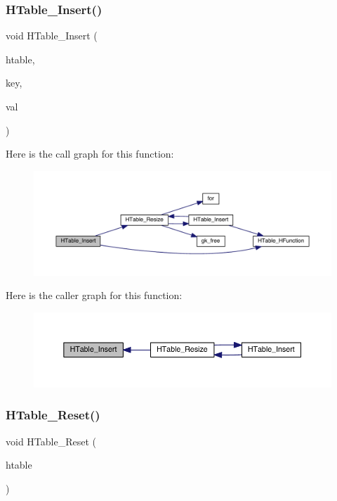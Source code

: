 \subsubsection{\texorpdfstring{H\+Table\+\_\+\+Insert()}{HTable\_Insert()}}
{\footnotesize\ttfamily void H\+Table\+\_\+\+Insert (\begin{DoxyParamCaption}\item[{\hyperlink{a00650}{gk\+\_\+\+H\+Table\+\_\+t} $\ast$}]{htable,  }\item[{int}]{key,  }\item[{int}]{val }\end{DoxyParamCaption})}

Here is the call graph for this function\+:\nopagebreak
\begin{figure}[H]
\begin{center}
\leavevmode
\includegraphics[width=350pt]{a00077_a39853dc7129323e7846d895c9026ad6f_cgraph}
\end{center}
\end{figure}
Here is the caller graph for this function\+:\nopagebreak
\begin{figure}[H]
\begin{center}
\leavevmode
\includegraphics[width=350pt]{a00077_a39853dc7129323e7846d895c9026ad6f_icgraph}
\end{center}
\end{figure}
\mbox{\label{a00077_a8a914231592293527bd1f42cdfb346d4}} 
\subsubsection{\texorpdfstring{H\+Table\+\_\+\+Reset()}{HTable\_Reset()}}
{\footnotesize\ttfamily void H\+Table\+\_\+\+Reset (\begin{DoxyParamCaption}\item[{\hyperlink{a00650}{gk\+\_\+\+H\+Table\+\_\+t} $\ast$}]{htable }\end{DoxyParamCaption})}

